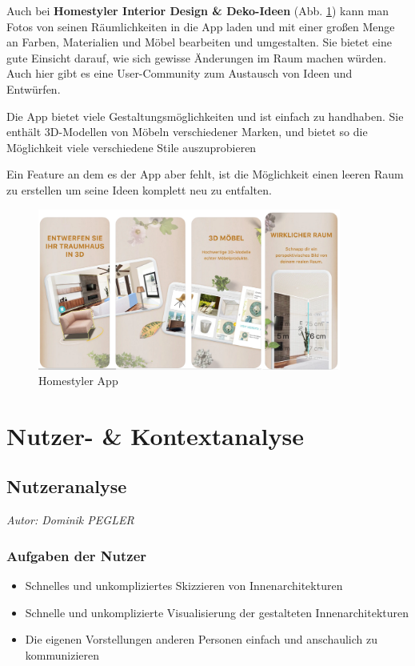 \documentclass[12pt,paper=a4,oneside,hidelinks,headings=small,captions=heading,captions=nooneline]{scrartcl}
\begin{document}
Auch bei \textbf{Homestyler Interior Design \& Deko-Ideen} (Abb. \ref{fig:m1_ko_03}) kann man Fotos von
seinen Räumlichkeiten in die App laden und mit einer großen Menge an
Farben, Materialien und Möbel bearbeiten und umgestalten. Sie bietet
eine gute Einsicht darauf, wie sich gewisse Änderungen im Raum machen
würden. Auch hier gibt es eine User-Community zum Austausch von Ideen
und Entwürfen.

Die App bietet viele Gestaltungsmöglichkeiten und ist einfach zu
handhaben. Sie enthält 3D-Modellen von Möbeln verschiedener Marken,
und bietet so die Möglichkeit viele verschiedene Stile auszuprobieren

Ein Feature an dem es der App aber fehlt, ist die Möglichkeit einen
leeren Raum zu erstellen um seine Ideen komplett neu zu entfalten.

\begin{figure}[htbp]
\centering
\includegraphics[height=200px]{./img/m1_konkurrenzanalyse_03.png}
\caption{\label{fig:m1_ko_03}Homestyler App}
\end{figure}

\section{Nutzer- \& Kontextanalyse}
\label{sec:orgaed35f1}

\subsection{Nutzeranalyse}
\label{sec:org32a7d97}
\emph{Autor: Dominik PEGLER}
\subsubsection{Aufgaben der Nutzer}
\label{sec:org6b70dd7}
\begin{itemize}
\item Schnelles und unkompliziertes Skizzieren von Innenarchitekturen
\item Schnelle und unkomplizierte Visualisierung der gestalteten Innenarchitekturen
\item Die eigenen Vorstellungen anderen Personen einfach und anschaulich
zu kommunizieren
\end{itemize}
\end{document}
